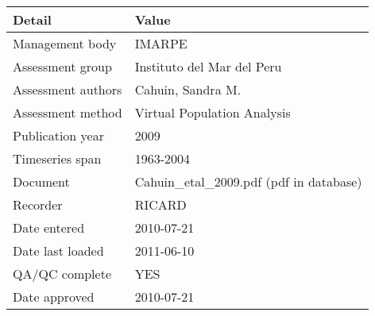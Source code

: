 \begin{table}[htb]
\centering
\begin{tabular}{ll}
\toprule
Detail & Value \\
\midrule
Management body    & IMARPE                                   \\
Assessment group   & Instituto del Mar del Peru               \\
Assessment authors & Cahuin, Sandra M.                        \\
Assessment method  & Virtual Population Analysis              \\
Publication year   & 2009                                     \\
Timeseries span    & 1963-2004                                \\
Document           & Cahuin\_etal\_2009.pdf (pdf in database) \\
Recorder           & RICARD                                   \\
Date entered       & 2010-07-21                               \\
Date last loaded   & 2011-06-10                               \\
QA/QC complete     & YES                                      \\
Date approved      & 2010-07-21                               \\
\bottomrule
\end{tabular}
\label{tab:assessdet}
\end{table}
